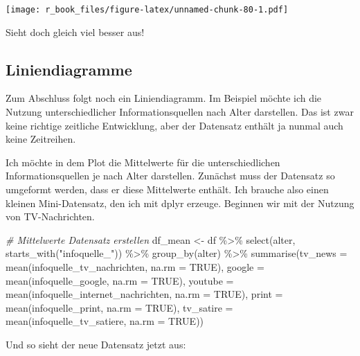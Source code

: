 \documentclass[
]{book}
\newenvironment{Shaded}{\begin{snugshade}}{\end{snugshade}}
\newcommand{\AttributeTok}[1]{\textcolor[rgb]{0.77,0.63,0.00}{#1}}
\newcommand{\CommentTok}[1]{\textcolor[rgb]{0.56,0.35,0.01}{\textit{#1}}}
\newcommand{\ConstantTok}[1]{\textcolor[rgb]{0.00,0.00,0.00}{#1}}
\newcommand{\FunctionTok}[1]{\textcolor[rgb]{0.00,0.00,0.00}{#1}}
\newcommand{\NormalTok}[1]{#1}
\newcommand{\OtherTok}[1]{\textcolor[rgb]{0.56,0.35,0.01}{#1}}
\newcommand{\SpecialCharTok}[1]{\textcolor[rgb]{0.00,0.00,0.00}{#1}}
\newcommand{\StringTok}[1]{\textcolor[rgb]{0.31,0.60,0.02}{#1}}
\begin{document}
\texttt{[image: r\_book\_files/figure-latex/unnamed-chunk-80-1.pdf]}

Sieht doch gleich viel besser aus!

\hypertarget{liniendiagramme}{%
\subsection{Liniendiagramme}\label{liniendiagramme}}

Zum Abschluss folgt noch ein Liniendiagramm. Im Beispiel möchte ich die Nutzung unterschiedlicher Informationsquellen nach Alter darstellen. Das ist zwar keine richtige zeitliche Entwicklung, aber der Datensatz enthält ja nunmal auch keine Zeitreihen.

Ich möchte in dem Plot die Mittelwerte für die unterschiedlichen Informationsquellen je nach Alter darstellen. Zunächst muss der Datensatz so umgeformt werden, dass er diese Mittelwerte enthält. Ich brauche also einen kleinen Mini-Datensatz, den ich mit dplyr erzeuge.
Beginnen wir mit der Nutzung von TV-Nachrichten.

\begin{Shaded}
\begin{Highlighting}[]
\CommentTok{\# Mittelwerte Datensatz erstellen}
\NormalTok{df\_mean }\OtherTok{\textless{}{-}}\NormalTok{ df }\SpecialCharTok{\%\textgreater{}\%} 
  \FunctionTok{select}\NormalTok{(alter, }\FunctionTok{starts\_with}\NormalTok{(}\StringTok{"infoquelle\_"}\NormalTok{)) }\SpecialCharTok{\%\textgreater{}\%} 
  \FunctionTok{group\_by}\NormalTok{(alter) }\SpecialCharTok{\%\textgreater{}\%} 
  \FunctionTok{summarise}\NormalTok{(}\AttributeTok{tv\_news =} \FunctionTok{mean}\NormalTok{(infoquelle\_tv\_nachrichten, }\AttributeTok{na.rm =} \ConstantTok{TRUE}\NormalTok{),}
            \AttributeTok{google =} \FunctionTok{mean}\NormalTok{(infoquelle\_google, }\AttributeTok{na.rm =} \ConstantTok{TRUE}\NormalTok{),}
            \AttributeTok{youtube =} \FunctionTok{mean}\NormalTok{(infoquelle\_internet\_nachrichten, }\AttributeTok{na.rm =} \ConstantTok{TRUE}\NormalTok{),}
            \AttributeTok{print =} \FunctionTok{mean}\NormalTok{(infoquelle\_print, }\AttributeTok{na.rm =} \ConstantTok{TRUE}\NormalTok{),}
            \AttributeTok{tv\_satire =} \FunctionTok{mean}\NormalTok{(infoquelle\_tv\_satiere, }\AttributeTok{na.rm =} \ConstantTok{TRUE}\NormalTok{)) }
\end{Highlighting}
\end{Shaded}

Und so sieht der neue Datensatz jetzt aus:
\end{document}

